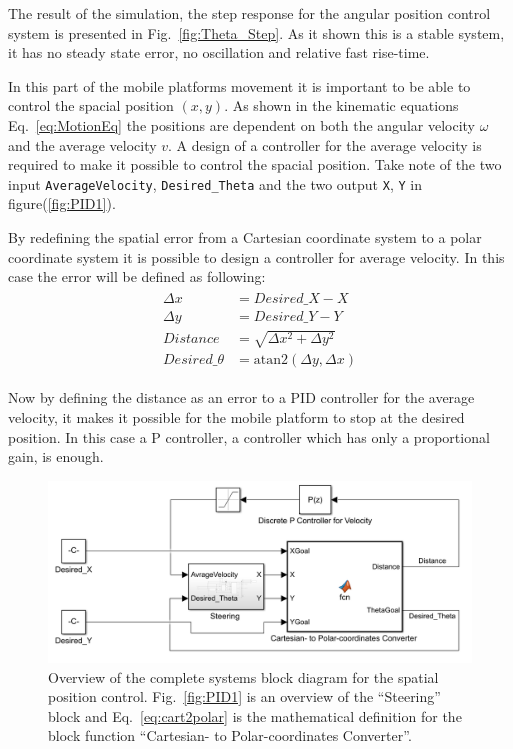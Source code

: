 The result of the simulation, the step response for the angular position control system is presented in Fig.~\ref{fig:Theta_Step}.
As it shown this is a stable system, it has no steady state error, no oscillation and relative fast rise-time.

In this part of the mobile platforms movement it is important to be able to control the spacial position $(x, y)$.
As shown in the kinematic equations Eq.~\eqref{eq:MotionEq} the positions are dependent on both the angular velocity $\omega$ and the average velocity $v$.
A design of a controller for the average velocity is required to make it possible to control the spacial position.
Take note of the two input \texttt{AverageVelocity}, \texttt{Desired\_Theta} and the two output \texttt{X}, \texttt{Y} in figure(\ref{fig:PID1}).

By redefining the spatial error from a Cartesian coordinate system to a polar coordinate system it is possible to design a controller for average velocity.
In this case the error will be defined as following:
\begin{eqnarray}
\begin{aligned}
\Delta x &= Desired\_X - X\\
\Delta y &= Desired\_Y - Y\\
Distance &= \sqrt{\Delta x^2 + \Delta y^2}\\
Desired\_\theta &= \text{atan2}(\Delta y, \Delta x)
\end{aligned}
\label{eq:cart2polar}
\end{eqnarray}

Now by defining the distance as an error to a PID controller for the average velocity, it makes it possible for the mobile platform to stop at the desired position.
In this case a P controller, a controller which has only a proportional gain, is enough.
\begin{figure}[h]
\centering
\includegraphics[width=\textwidth]{sections/assets/V_PID.PNG}
\caption{Overview of the complete systems block diagram for the spatial position control. Fig.~\ref{fig:PID1} is an overview of the ``Steering'' block and Eq.~\eqref{eq:cart2polar} is the mathematical definition for the block function ``Cartesian- to Polar-coordinates Converter''.}
\label{fig:V_PID}
\end{figure}

